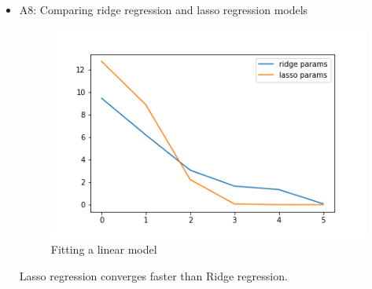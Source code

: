 \documentclass{article}
\begin{document}
\begin{itemize}
\item A8: Comparing ridge regression and lasso regression models\\
\begin{figure}[htbp]
	\centering
	\includegraphics[scale = 0.7]{ridge_regression.png}
	\caption{Fitting a linear model}
\end{figure}
Lasso regression converges faster than Ridge regression.
\end{itemize}
\end{document}
